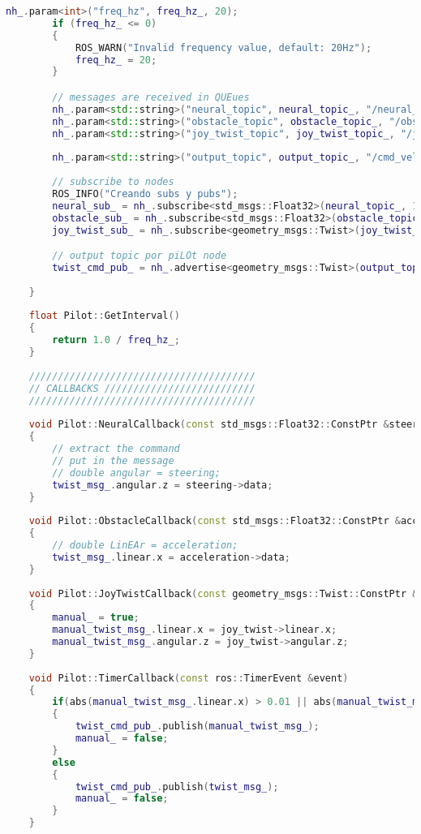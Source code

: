 \begin{lstlisting}[title={pilot\_node.cpp},language=c++]
        nh_.param<int>("freq_hz", freq_hz_, 20);
        if (freq_hz_ <= 0)
        {
            ROS_WARN("Invalid frequency value, default: 20Hz");
            freq_hz_ = 20;
        }

        // messages are received in QUEues
        nh_.param<std::string>("neural_topic", neural_topic_, "/neural_output");
        nh_.param<std::string>("obstacle_topic", obstacle_topic_, "/obstacle_output");
        nh_.param<std::string>("joy_twist_topic", joy_twist_topic_, "/joy_cmd_vel");
    
        nh_.param<std::string>("output_topic", output_topic_, "/cmd_vel");
        
        // subscribe to nodes
        ROS_INFO("Creando subs y pubs");
        neural_sub_ = nh_.subscribe<std_msgs::Float32>(neural_topic_, 1, &Pilot::NeuralCallback, this);
        obstacle_sub_ = nh_.subscribe<std_msgs::Float32>(obstacle_topic_, 1, &Pilot::ObstacleCallback, this);
        joy_twist_sub_ = nh_.subscribe<geometry_msgs::Twist>(joy_twist_topic_, 1, &Pilot::JoyTwistCallback, this);

        // output topic por piLOt node
        twist_cmd_pub_ = nh_.advertise<geometry_msgs::Twist>(output_topic_, 1);
    
    }
    
    float Pilot::GetInterval()
    {
        return 1.0 / freq_hz_;
    }
    
    ///////////////////////////////////////
    // CALLBACKS //////////////////////////
    ///////////////////////////////////////
    
    void Pilot::NeuralCallback(const std_msgs::Float32::ConstPtr &steering)
    {
        // extract the command
        // put in the message
        // double angular = steering;
        twist_msg_.angular.z = steering->data;
    }
    
    void Pilot::ObstacleCallback(const std_msgs::Float32::ConstPtr &acceleration)
    {
        // double LinEAr = acceleration;
        twist_msg_.linear.x = acceleration->data;
    }
    
    void Pilot::JoyTwistCallback(const geometry_msgs::Twist::ConstPtr &joy_twist)
    {
        manual_ = true;
        manual_twist_msg_.linear.x = joy_twist->linear.x;
        manual_twist_msg_.angular.z = joy_twist->angular.z;
    }
    
    void Pilot::TimerCallback(const ros::TimerEvent &event)
    {
        if(abs(manual_twist_msg_.linear.x) > 0.01 || abs(manual_twist_msg_.angular.z) > 0.01)
        {
            twist_cmd_pub_.publish(manual_twist_msg_);
            manual_ = false;
        }
        else
        {
            twist_cmd_pub_.publish(twist_msg_);
            manual_ = false;
        }
    }
    

\end{lstlisting}
